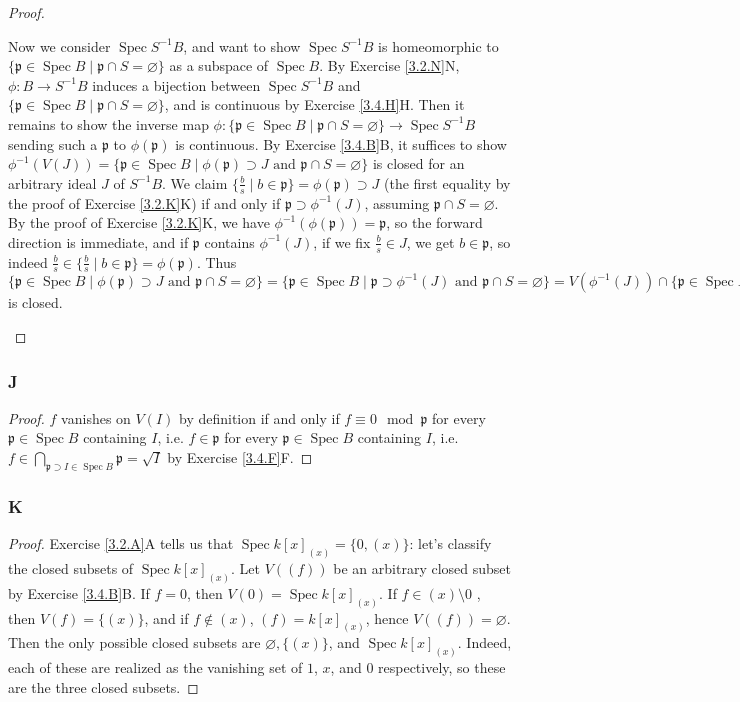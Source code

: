 \documentclass{article}
\newcommand{\frkp}{\mathfrak{p}}
\DeclareMathOperator{\Spec}{\mathrm{Spec}}
\let\emptyset\varnothing
\begin{document}
\begin{proof}
\begin{enumerate}[(a)]
        Now we consider $\Spec S^{-1} B$, and want to show $\Spec S^{-1}B$ is homeomorphic to $\{\frkp \in \Spec B \mid \frkp \cap S = \emptyset\}$ as a subspace of $\Spec B$. By Exercise \ref{3.2.N}N, $\phi:B\to S^{-1}B$ induces a bijection between $\Spec S^{-1}B$ and $\{\frkp \in \Spec B \mid \frkp \cap S = \emptyset\}$, and is continuous by Exercise \ref{3.4.H}H. Then it remains to show the inverse map $\phi:\{\frkp \in \Spec B \mid \frkp \cap S = \emptyset\} \to \Spec S^{-1}B$ sending such a $\frkp$ to $\phi(\frkp)$ is continuous. By Exercise \ref{3.4.B}B, it suffices to show $\phi^{-1}(V(J))=\{ \frkp \in \Spec B \mid \phi(\frkp) \supset J \text{ and } \frkp \cap S = \emptyset\}$ is closed for an arbitrary ideal $J$ of $S^{-1}B$. We claim $\{ \frac{b}{s} \mid b \in \frkp \} = \phi(\frkp)\supset J$ (the first equality by the proof of Exercise \ref{3.2.K}K) if and only if $\frkp \supset \phi^{-1}(J)$, assuming $\frkp \cap S = \emptyset$. By the proof of Exercise \ref{3.2.K}K, we have $\phi^{-1}(\phi(\frkp))=\frkp$, so the forward direction is immediate, and if $\frkp$ contains $\phi^{-1}(J)$, if we fix $\frac{b}{s}\in J$, we get $b\in \frkp$, so indeed $\frac{b}{s}\in \{ \frac{b}{s} \mid b \in \frkp \} = \phi(\frkp)$. Thus $\{ \frkp \in \Spec B \mid \phi(\frkp) \supset J \text{ and } \frkp \cap S = \emptyset\}=\{\frkp \in \Spec B \mid \frkp \supset \phi^{-1}(J) \text{ and } \frkp \cap S = \emptyset\} =V(\phi^{-1}(J)) \cap \{\frkp \in \Spec B \mid  \frkp \cap S = \emptyset\}$ is closed.
    \end{enumerate}
\end{proof}
\subsubsection{J}\label{3.4.J}
\begin{proof}
    $f$ vanishes on $V(I)$ by definition if and only if $f\equiv 0 \mod \frkp$ for every $\frkp \in \Spec B$ containing $I$, i.e. $f\in \frkp $ for every $\frkp \in \Spec B$ containing $I$, i.e. $f\in \bigcap_{\frkp \supset I \in \Spec B} \frkp = \sqrt I$ by Exercise \ref{3.4.F}F.
\end{proof}
\subsubsection{K}\label{3.4.K}
\begin{proof}
    Exercise \ref{3.2.A}A tells us that $\Spec k[x]_{(x)} = \{ 0, (x)\}$: let's classify the closed subsets of $\Spec k[x]_{(x)}$. Let $V((f))$ be an arbitrary closed subset by Exercise \ref{3.4.B}B. If $f=0$, then $V(0)=\Spec k[x]_{(x)}$. If $f\in (x)\setminus 0$ , then $V(f)=\{(x)\}$, and if $f\notin (x)$, $(f)= k[x]_{(x)}$, hence $V((f))=\emptyset$. Then the only possible closed subsets are $\emptyset, \{(x)\}$, and $\Spec k[x]_{(x)}.$ Indeed, each of these are realized as the vanishing set of $1$, $x$, and $0$ respectively, so these are the three closed subsets.
\end{proof}
\end{document}
